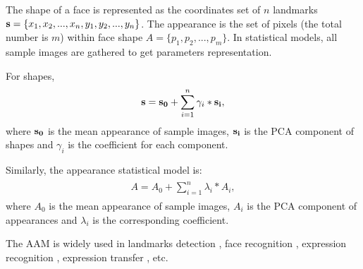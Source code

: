 	The shape of a face is represented as the coordinates set of $n$ landmarks ${\bf s} = 
	\{x_1,x_2,...,x_n,y_1,y_2,...,y_n\}$. The appearance is the set of pixels (the total number
	is $m$) within face shape $A=\{p_1,p_2,...,p_m\}$. In statistical models, all sample images
	are gathered to get parameters representation. 

	For shapes,
	\begin{align}
		\label{equ:aam_shape}
		\begin{split}
			{\bf s} = {\bf s_0} + \sum_{i=1}^{n}\gamma_i * {\bf s_i},
		\end{split}
	\end{align}
	where ${\bf s_0}$ is the mean appearance of sample images, ${\bf s_i}$ is the PCA 
	component of shapes and $\gamma_i$ is the coefficient for each component. 

	Similarly, the appearance statistical model is:
	\begin{align}
		\label{equ:aam_appearance}
		\begin{split}
			A = A_0 + \sum_{i=1}^{n}\lambda_i * A_i,
		\end{split}
	\end{align}
	where $A_0$ is the mean appearance of sample images, $A_i$ is the PCA component 
	of appearances and $\lambda_i$ is the corresponding coefficient. 

	The AAM is widely used in landmarks detection \cite{landmarks14}, face recognition
	\cite{aamFR98}, expression recognition \cite{aamER09}, expression transfer \cite{Theobald07}, etc.

